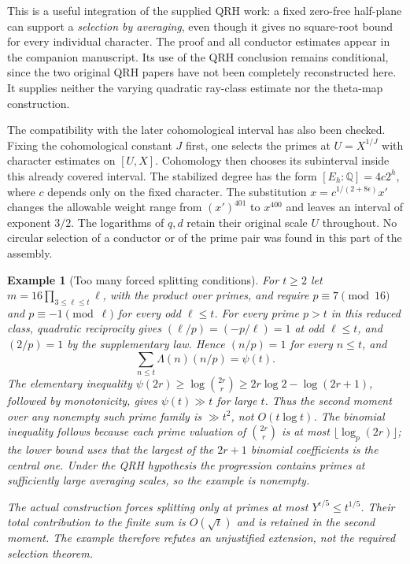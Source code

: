 \documentclass[11pt,a4paper]{article}
\newtheorem{example}[proposition]{Example}
\theoremstyle{remark}
\newcommand{\Q}{\mathbb Q}
\begin{document}
This is a useful integration of the supplied QRH work: a fixed
zero-free half-plane can support a \emph{selection by averaging}, even
though it gives no square-root bound for every individual character.
The proof and all conductor estimates appear in the companion
manuscript. Its use of the QRH conclusion remains conditional, since
the two original QRH papers have not been completely reconstructed
here. It supplies neither the varying quadratic ray-class estimate
nor the theta-map construction.

The compatibility with the later cohomological interval has also
been checked. Fixing the cohomological constant $J$ first, one
selects the primes at $U=X^{1/J}$ with character estimates on
$[U,X]$. Cohomology then chooses its subinterval inside this
already covered interval. The stabilized degree has the form
$[E_h:\Q]=4c2^h$, where $c$ depends only on the fixed character.
The substitution $x=c^{1/(2+8\epsilon)}x'$ changes the allowable
weight range from $(x')^{401}$ to $x^{400}$ and leaves an interval
of exponent $3/2$. The logarithms of $q,d$ retain their original
scale $U$ throughout. No circular selection of a conductor or
of the prime pair was found in this part of the assembly.

\begin{example}[Too many forced splitting conditions]
For $t\ge2$ let $m=16\prod_{3\le\ell\le t}\ell$, with the product
over primes, and require $p\equiv7\pmod{16}$ and
$p\equiv-1\pmod\ell$ for every odd $\ell\le t$.
For every prime $p>t$ in this reduced class, quadratic reciprocity
gives $(\ell/p)=(-p/\ell)=1$ at odd $\ell\le t$, and
$(2/p)=1$ by the supplementary law. Hence $(n/p)=1$ for every
$n\le t$, and
\[
      \sum_{n\le t}\Lambda(n)(n/p)=\psi(t).
\]
The elementary inequality
$\psi(2r)\ge\log\binom{2r}{r}
\ge2r\log2-\log(2r+1)$, followed by monotonicity, gives
$\psi(t)\gg t$ for large $t$. Thus the second moment over any
nonempty such prime family is $\gg t^2$, not $O(t\log t)$.
The binomial inequality follows because each prime valuation of
$\binom{2r}{r}$ is at most $\lfloor\log_p(2r)\rfloor$;
the lower bound uses that the largest of the $2r+1$ binomial
coefficients is the central one. Under the QRH hypothesis the
progression contains primes at sufficiently large averaging scales,
so the example is nonempty.

The actual construction forces splitting only at primes at most
$Y^{\epsilon/5}\le t^{1/5}$. Their total contribution to the
finite sum is $O(\sqrt t)$ and is retained in the second moment.
The example therefore refutes an unjustified extension, not the
required selection theorem.
\end{example}
\end{document}
